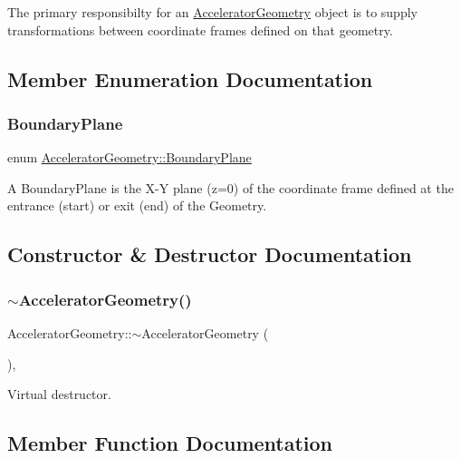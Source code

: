 The primary responsibilty for an \hyperlink{classAcceleratorGeometry}{Accelerator\+Geometry} object is to supply transformations between coordinate frames defined on that geometry. 

\subsection{Member Enumeration Documentation}
\mbox{\label{classAcceleratorGeometry_a5c1661938176102f235836f5a8be6034}} 
\subsubsection{\texorpdfstring{Boundary\+Plane}{BoundaryPlane}}
{\footnotesize\ttfamily enum \hyperlink{classAcceleratorGeometry_a5c1661938176102f235836f5a8be6034}{Accelerator\+Geometry\+::\+Boundary\+Plane}}

A Boundary\+Plane is the X-\/Y plane (z=0) of the coordinate frame defined at the entrance (start) or exit (end) of the Geometry. 

\subsection{Constructor \& Destructor Documentation}
\mbox{\label{classAcceleratorGeometry_aff2b5c1086ebcb68c68786e56d7db458}} 
\subsubsection{\texorpdfstring{$\sim$\+Accelerator\+Geometry()}{~AcceleratorGeometry()}}
{\footnotesize\ttfamily Accelerator\+Geometry\+::$\sim$\+Accelerator\+Geometry (\begin{DoxyParamCaption}{ }\end{DoxyParamCaption})\hspace{0.3cm}{\ttfamily [inline]}, {\ttfamily [virtual]}}

Virtual destructor. 

\subsection{Member Function Documentation}
\mbox{\label{classAcceleratorGeometry_a2db830fe927af3c9cba59b8452370bfb}} 
